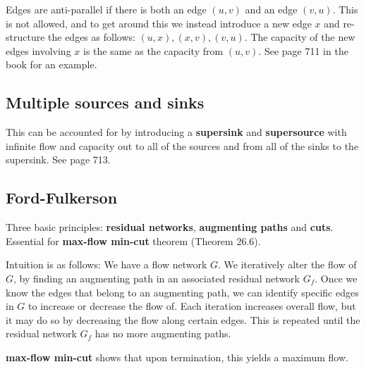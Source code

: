 Edges are anti-parallel if there is both an edge $(u,v)$ and an edge $(v,u)$. This is not allowed,
and to get around this we instead introduce a new edge $x$ and re-structure the edges as follows:
$(u,x), (x,v), (v,u)$. The capacity of the new edges involving $x$ is the same as the capacity from
$(u,v)$. See page 711 in the book for an example.

\subsection{Multiple sources and sinks}
This can be accounted for by introducing a \textbf{supersink} and \textbf{supersource} with infinite
flow and capacity out to all of the sources and from all of the sinks to the supersink. See page 713.

\subsection{Ford-Fulkerson}
Three basic principles: \textbf{residual networks}, \textbf{augmenting paths} and \textbf{cuts}.
Essential for \textbf{max-flow min-cut} theorem (Theorem 26.6).

Intuition is as follows: We have a flow network $G$. We iteratively alter the flow of $G$, 
by finding an augmenting path in an associated residual network $G_f$. Once we know the edges
that belong to an augmenting path, we can identify specific edges in $G$ to increase or decrease
the flow of. Each iteration increases overall flow, but it may do so by decreasing the flow along
certain edges. This is repeated until the residual network $G_f$ has no more augmenting paths.

\textbf{max-flow min-cut} shows that upon termination, this yields a maximum flow.

